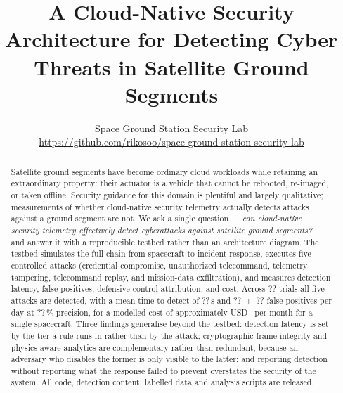 \documentclass[10pt,twocolumn]{article}
\title{\textbf{A Cloud-Native Security Architecture for Detecting Cyber Threats
in Satellite Ground Segments}}
\author{%
  \normalsize Space Ground Station Security Lab\\
  \normalsize \url{https://github.com/rikosoo/space-ground-station-security-lab}
}
\date{}
\newcommand{\ResTrials}{??}\newcommand{\ResWarmupDays}{??}%
\newcommand{\ResFPDay}{??}\newcommand{\ResFPDayCI}{??}%
\newcommand{\ResPrecision}{??}\newcommand{\ResTTDMean}{??}%
\begin{document}
\maketitle

\begin{abstract}
Satellite ground segments have become ordinary cloud workloads while retaining
an extraordinary property: their actuator is a vehicle that cannot be rebooted,
re-imaged, or taken offline. Security guidance for this domain is plentiful and
largely qualitative; measurements of whether cloud-native security telemetry
actually detects attacks against a ground segment are not. We ask a single
question --- \emph{can cloud-native security telemetry effectively detect
cyberattacks against satellite ground segments?} --- and answer it with a
reproducible testbed rather than an architecture diagram. The testbed simulates
the full chain from spacecraft to incident response, executes five controlled
attacks (credential compromise, unauthorized telecommand, telemetry tampering,
telecommand replay, and mission-data exfiltration), and measures detection
latency, false positives, defensive-control attribution, and cost. Across
\ResTrials{} trials all five attacks are detected, with a mean time to detect of
\ResTTDMean{}\,s and \ResFPDay{}~$\pm$~\ResFPDayCI{} false positives per day at
\ResPrecision{}\,\% precision, for a modelled cost of approximately
USD~\CostMonthly{} per month for a single spacecraft. Three findings generalise
beyond the testbed: detection latency is set by the tier a rule runs in rather
than by the attack; cryptographic frame integrity and physics-aware analytics are
complementary rather than redundant, because an adversary who disables the former
is only visible to the latter; and reporting detection without reporting what the
response failed to prevent overstates the security of the system. All code,
detection content, labelled data and analysis scripts are released.
\end{abstract}












\balance


\end{document}
